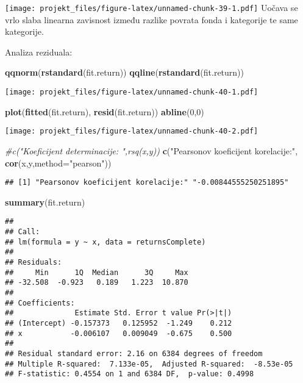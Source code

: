 \documentclass[
]{article}
\newenvironment{Shaded}{\begin{snugshade}}{\end{snugshade}}
\newcommand{\CommentTok}[1]{\textcolor[rgb]{0.56,0.35,0.01}{\textit{#1}}}
\newcommand{\DataTypeTok}[1]{\textcolor[rgb]{0.13,0.29,0.53}{#1}}
\newcommand{\DecValTok}[1]{\textcolor[rgb]{0.00,0.00,0.81}{#1}}
\newcommand{\KeywordTok}[1]{\textcolor[rgb]{0.13,0.29,0.53}{\textbf{#1}}}
\newcommand{\NormalTok}[1]{#1}
\newcommand{\StringTok}[1]{\textcolor[rgb]{0.31,0.60,0.02}{#1}}
\begin{document}
\texttt{[image: projekt\_files/figure-latex/unnamed-chunk-39-1.pdf]}
Uočava se vrlo slaba linearna zavisnost između razlike povrata fonda i
kategorije te same kategorije.

Analiza reziduala:

\begin{Shaded}
\begin{Highlighting}[]
\KeywordTok{qqnorm}\NormalTok{(}\KeywordTok{rstandard}\NormalTok{(fit.return))}
\KeywordTok{qqline}\NormalTok{(}\KeywordTok{rstandard}\NormalTok{(fit.return))}
\end{Highlighting}
\end{Shaded}

\texttt{[image: projekt\_files/figure-latex/unnamed-chunk-40-1.pdf]}

\begin{Shaded}
\begin{Highlighting}[]
\KeywordTok{plot}\NormalTok{(}\KeywordTok{fitted}\NormalTok{(fit.return), }\KeywordTok{resid}\NormalTok{(fit.return))}
\KeywordTok{abline}\NormalTok{(}\DecValTok{0}\NormalTok{,}\DecValTok{0}\NormalTok{)}
\end{Highlighting}
\end{Shaded}

\texttt{[image: projekt\_files/figure-latex/unnamed-chunk-40-2.pdf]}

\begin{Shaded}
\begin{Highlighting}[]
\CommentTok{#c("Koeficijent determinacije: ",rsq(x,y))}
\KeywordTok{c}\NormalTok{(}\StringTok{"Pearsonov koeficijent korelacije:"}\NormalTok{, }\KeywordTok{cor}\NormalTok{(x,y,}\DataTypeTok{method=}\StringTok{"pearson"}\NormalTok{))}
\end{Highlighting}
\end{Shaded}

\begin{verbatim}
## [1] "Pearsonov koeficijent korelacije:" "-0.00844555250251895"
\end{verbatim}

\begin{Shaded}
\begin{Highlighting}[]
\KeywordTok{summary}\NormalTok{(fit.return)}
\end{Highlighting}
\end{Shaded}

\begin{verbatim}
## 
## Call:
## lm(formula = y ~ x, data = returnsComplete)
## 
## Residuals:
##     Min      1Q  Median      3Q     Max 
## -32.508  -0.923   0.189   1.223  10.870 
## 
## Coefficients:
##              Estimate Std. Error t value Pr(>|t|)
## (Intercept) -0.157373   0.125952  -1.249    0.212
## x           -0.006107   0.009049  -0.675    0.500
## 
## Residual standard error: 2.16 on 6384 degrees of freedom
## Multiple R-squared:  7.133e-05,  Adjusted R-squared:  -8.53e-05 
## F-statistic: 0.4554 on 1 and 6384 DF,  p-value: 0.4998
\end{verbatim}
\end{document}
